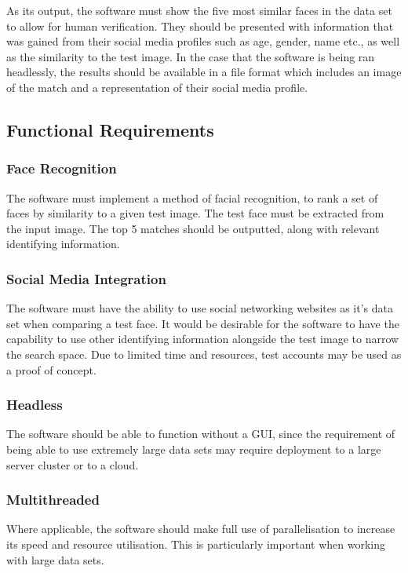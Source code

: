 \documentclass{article}
\begin{document}
As its output, the software must show the five most similar faces in the data set to allow for human verification. They should be presented with information that was gained from their social media profiles such as age, gender, name etc., as well as the similarity to the test image. In the case that the software is being ran headlessly, the results should be available in a file format which includes an image of the match and a representation of their social media profile.

\subsection{Functional Requirements}
\subsubsection{Face Recognition}
The software must implement a method of facial recognition, to rank a set of faces by similarity to a given test image. The test face must be extracted from the input image. The top 5 matches should be outputted, along with relevant identifying information.

\subsubsection{Social Media Integration}
The software must have the ability to use social networking websites as it's data set when comparing a test face. It would be desirable for the software to have the capability to use other identifying information alongside the test image to narrow the search space. Due to limited time and resources, test accounts may be used as a proof of concept.

\subsubsection{Headless}
The software should be able to function without a GUI, since the requirement of being able to use extremely large data sets may require deployment to a large server cluster or to a cloud.

\subsubsection{Multithreaded}
Where applicable, the software should make full use of parallelisation to increase its speed and resource utilisation. This is particularly important when working with large data sets.
\end{document}
